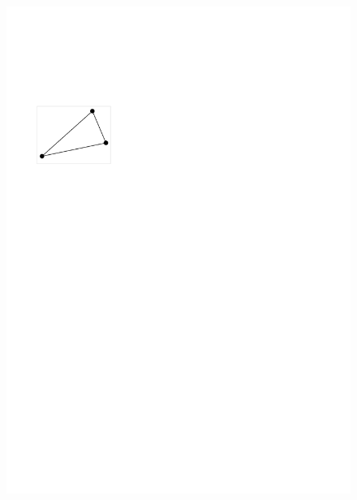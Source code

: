 \documentclass[twoside,a4paper,fleqn,12pt]{book}
\begin{document}
\begin{figure}[h]
  \centering
  \includegraphics[scale=0.8]{triraster1}
  \qquad

\end{figure}
\end{document}
